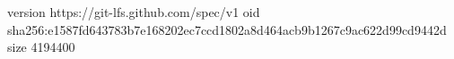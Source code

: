 version https://git-lfs.github.com/spec/v1
oid sha256:e1587fd643783b7e168202ec7ccd1802a8d464acb9b1267c9ac622d99cd9442d
size 4194400
